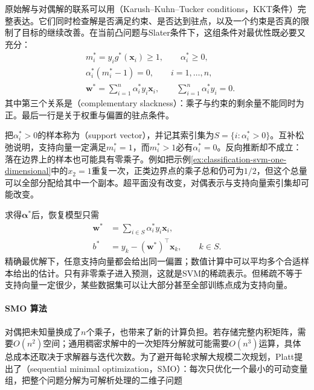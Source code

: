 原始解与对偶解的联系可以用（Karush--Kuhn--Tucker conditions，KKT条件）完整表达。它们同时检查解是否满足约束、是否达到驻点，以及一个约束是否真的限制了目标的继续改善。在当前凸问题与Slater条件下，这组条件对最优性既必要又充分：
\begin{equation}
  \begin{aligned}
    &m_i^{\ast}=y_i g^{\ast}(\bm{x}_i)\ge1,
      \qquad \alpha_i^{\ast}\ge0,\\
    &\alpha_i^{\ast}(m_i^{\ast}-1)=0,
      \qquad i=1,\ldots,n,\\
    &\bm{w}^{\ast}
      =\sum_{i=1}^n\alpha_i^{\ast}y_i\bm{x}_i,
      \qquad \sum_{i=1}^n\alpha_i^{\ast}y_i=0.
  \end{aligned}
  \label{eq:classification-svm-hard-kkt}
\end{equation}
其中第三个关系是（complementary slackness）：乘子与约束的剩余量不能同时为正。最后一行是关于权重与偏置的驻点条件。

把$\alpha_i^{\ast}>0$的样本称为（support vector），并记其索引集为$S=\{i:\alpha_i^{\ast}>0\}$。互补松弛说明，支持向量一定满足$m_i^{\ast}=1$，而$m_i^{\ast}>1$必有$\alpha_i^{\ast}=0$。反向推断却不成立：落在边界上的样本也可能具有零乘子。例如把示例\ref{ex:classification-svm-one-dimensional}中的$x_2=1$重复一次，正类边界点的乘子总和仍可为$1/2$，但这个总量可以全部分配给其中一个副本。超平面没有改变，对偶表示与支持向量索引集却可能改变。

求得$\bm{\alpha}^{\ast}$后，恢复模型只需
\begin{equation}
  \begin{aligned}
    \bm{w}^{\ast}
      &=\sum_{i\in S}\alpha_i^{\ast}y_i\bm{x}_i,\\
    b^{\ast}
      &=y_k-(\bm{w}^{\ast})^{\top}\bm{x}_k,
        \qquad k\in S.
  \end{aligned}
  \label{eq:classification-svm-recover}
\end{equation}
精确最优解下，任意支持向量都会给出同一偏置；数值计算中可以平均多个合适样本给出的估计。只有非零乘子进入预测，这就是SVM的稀疏表示。但稀疏不等于支持向量一定很少，某些数据集可以让大部分甚至全部训练点成为支持向量。

\paragraph{SMO 算法}
\label{sec:classification-svm-smo}

对偶把未知量换成了$n$个乘子，也带来了新的计算负担。若存储完整内积矩阵，需要$O(n^2)$空间；通用稠密求解中的一次矩阵分解就可能需要$O(n^3)$运算，具体总成本还取决于求解器与迭代次数。为了避开每轮求解大规模二次规划，Platt提出了（sequential minimal optimization，SMO）：每次只优化一个最小的可动变量组，把整个问题分解为可解析处理的二维子问题

